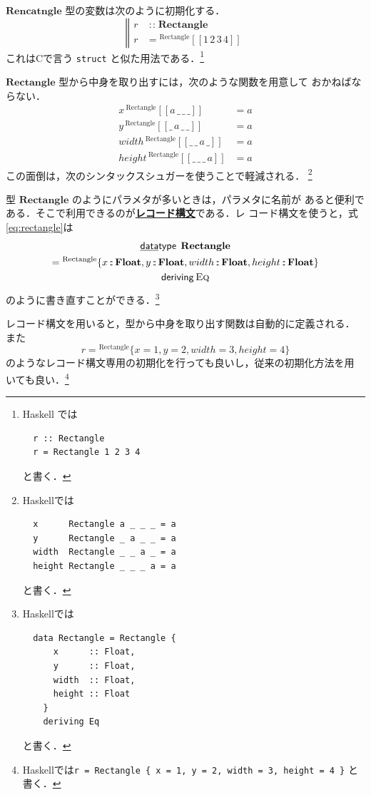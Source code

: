 \documentclass[a5paper,twoside,fleqn,draft]{jsbook}
\def\[{[\![}
\def\]{]\!]}
\newcommand{\programminglanguage}[1]{\textsf{#1}}
\newcommand{\clang}{\programminglanguage{C}}
\newcommand{\haskell}{\programminglanguage{Haskell}}
\newcommand{\keyword}[1]{{\underline{\textbf{#1}}}}
\newcommand{\code}[1]{\texttt{#1}}
\newcommand{\mBrace}{\Vert}
\newcommand{\mKeyword}[1]{\mathsf{#1}}
\newcommand{\mKeywordUnderline}[1]{\text{\underline{\textsf{#1}}}}
\newcommand{\mDataTypeKeyword}{\mKeywordUnderline{data}\mKeyword{type}}
\newcommand{\mDerivingKeyword}{\mKeyword{deriving}}
\DeclareMathOperator{\mDataType}{\mDataTypeKeyword}
\DeclareMathOperator{\mDeriving}{\mDerivingKeyword}
\DeclareMathOperator{\mIn}{{:\!:}}
\newcommand{\mType}[1]{\mathbf{#1}} %
\newcommand{\mFloatType}{\mType{Float}}
\newcommand{\mValueConstructor}[1]{\mathrm{#1}}
\newcommand{\mValueWith}[2]{{}^\mValueConstructor{#1}\[#2\]}
\newcommand{\mValueRecordWith}[2]{{}^\mValueConstructor{#1}\{#2\}}
\newcommand{\mValueRecordBeginWith}[1]{{}^\mValueConstructor{#1}\{}
\newcommand{\mValueRecordEnd}{\}}
\newcommand{\mTypeClass}[1]{\textsc{#1}} %
\newcommand{\mEqTypeClass}{\mTypeClass{Eq}}
\begin{document}
$\mType{Rencatngle}$ 型の変数は次のように初期化する．
\begin{equation}
  \left\mBrace
  \begin{aligned}
    r&\mIn\mType{Rectangle}\\
    r&=\mValueWith{Rectangle}{1\,2\,3\,4}
  \end{aligned}
  \right.
\end{equation}
これは\clang で言う \code{struct} と似た用法である．\footnote{\haskell
では
\begin{verbatim}
  r :: Rectangle
  r = Rectangle 1 2 3 4
\end{verbatim}
と書く．}

$\mType{Rectangle}$ 型から中身を取り出すには，次のような関数を用意して
おかねばならない．
\begin{align}
  x\,\mValueWith{Rectangle}{a\,\_\,\_\,\_}
  &=a\\
  y\,\mValueWith{Rectangle}{\_\,a\,\_\,\_}
  &=a\\
  width\,\mValueWith{Rectangle}{\_\,\_\,a\,\_}
  &=a\\
  height\,\mValueWith{Rectangle}{\_\,\_\,\_\,a}
  &=a
\end{align}
この面倒は，次のシンタックスシュガーを使うことで軽減される．
\footnote{\haskell では
\begin{verbatim}
  x      Rectangle a _ _ _ = a
  y      Rectangle _ a _ _ = a
  width  Rectangle _ _ a _ = a
  height Rectangle _ _ _ a = a
\end{verbatim}
と書く．}

型 $\mType{Rectangle}$ のようにパラメタが多いときは，パラメタに名前が
あると便利である．そこで利用できるのが\keyword{レコード構文}である．レ
コード構文を使うと，式\eqref{eq:rectangle}は
\begin{multline}
  \mDataType\;\mType{Rectangle}\\
  =\mValueRecordBeginWith{Rectangle}
  x\mIn\mFloatType,
  y\mIn\mFloatType,
  width\mIn\mFloatType,
  height\mIn\mFloatType
  \mValueRecordEnd\\
  \mDeriving\mEqTypeClass
\end{multline}
のように書き直すことができる．\footnote{\haskell では
\begin{verbatim}
  data Rectangle = Rectangle {
      x      :: Float,
      y      :: Float,
      width  :: Float,
      height :: Float
    }
    deriving Eq
\end{verbatim}
と書く．}

レコード構文を用いると，型から中身を取り出す関数は自動的に定義される．
また
\begin{equation}
  r=
  \mValueRecordWith{Rectangle}{
    x=1,
    y=2,
    width=3,
    height=4
  }
\end{equation}
のようなレコード構文専用の初期化を行っても良いし，従来の初期化方法を用
いても良い．\footnote{\haskell では\code{r = Rectangle \{ x = 1, y =
    2, width = 3, height = 4 \}} と書く．}
\end{document}
